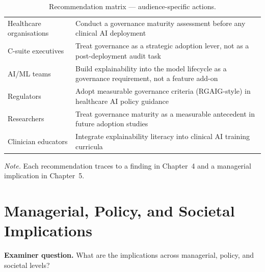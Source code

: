 {\tablestripes\tablefontsize
{}
\begin{xltabular}{\textwidth}{@{} >{\raggedright\arraybackslash}p{4.0cm} L @{}}
\caption[Recommendation matrix]{Recommendation matrix --- audience-specific actions.}\label{tab:dist_recommendation_matrix} \\
\toprule
{} &  \\
\midrule
\endfirsthead
\endhead
\bottomrule
\endlastfoot
Healthcare organisations & Conduct a governance maturity assessment before any clinical AI deployment \\
\addlinespace
C-suite executives & Treat governance as a strategic adoption lever, not as a post-deployment audit task \\
\addlinespace
AI/ML teams & Build explainability into the model lifecycle as a governance requirement, not a feature add-on \\
\addlinespace
Regulators & Adopt measurable governance criteria (RGAIG-style) in healthcare AI policy guidance \\
\addlinespace
Researchers & Treat governance maturity as a measurable antecedent in future adoption studies \\
\addlinespace
Clinician educators & Integrate explainability literacy into clinical AI training curricula \\
\end{xltabular}}

\vspace{0.3em}\noindent\textit{Note.} Each recommendation traces to a finding in Chapter~4 and a managerial implication in Chapter~5.


\section{Managerial, Policy, and Societal Implications}
\label{app:distinction_implications}

\noindent\textbf{Examiner question.} What are the implications across managerial, policy, and societal levels?


